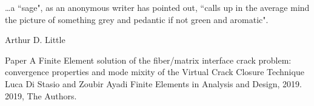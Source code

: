 \documentclass[12pt,a4paper,openright,final,twoside]{msethesis}
\begin{document}

%

\def\chaponequote{\dots a ``sage", as an anonymous writer has pointed out, ``calls up in the average mind the picture of something grey and pedantic if not green and aromatic"\\[.5\baselineskip]Arthur D. Little}
\def\chaponequotetext{\dots a ``sage", as an anonymous writer has pointed out, ``calls up in the average mind the picture of something grey and pedantic if not green and aromatic".}
\def\chaponequoteauthor{Arthur D. Little~\cite{Little1924}}
\epigraph{\chaponequotetext}{\chaponequoteauthor}


%

%

\makebib


%
\startpapers

\def\paperheader{Paper A}
\def\papertitle{Finite Element solution of the fiber/matrix interface crack problem: convergence properties and mode mixity of the Virtual Crack Closure Technique}
\def\paperauthorstring{Luca Di Stasio and Zoubir Ayadi}
\def\referencestring{Finite Elements in Analysis and Design, 2019.}
\def\copyrightstring{2019, The Authors.}


\newrefsection
\makepapersubmitted
  {\paperheader}
  {\papertitle}
  {\paperauthorstring}
  {\referencestring}
  {\copyrightstring}
\end{document}
